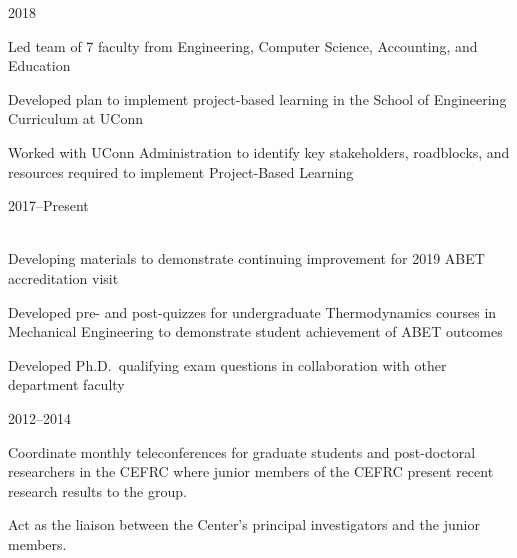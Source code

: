 \begin{lonelist}

\item[]  \hfill 2018\\

\begin{innerlist}
    \item Led team of 7 faculty from Engineering, Computer Science, Accounting, and
    Education
    \item Developed plan to implement project-based learning in the School of Engineering
    Curriculum at UConn
    \item Worked with UConn Administration to identify key stakeholders, roadblocks, and
    resources required to implement Project-Based Learning
\end{innerlist}

\item[]  \hfill 2017--Present\\
\\

\begin{innerlist}
    \item Developing materials to demonstrate continuing improvement for 2019 ABET
    accreditation visit
    \item Developed pre- and post-quizzes for undergraduate Thermodynamics courses in
    Mechanical Engineering to demonstrate student achievement of ABET outcomes
    \item Developed Ph.D.\ qualifying exam questions in collaboration with other
    department faculty
\end{innerlist}

\item[]  \hfill 2012--2014\\

\begin{innerlist}
    \item Coordinate monthly teleconferences for graduate students and post-doctoral
    researchers in the CEFRC where junior members of the CEFRC present recent research
    results to the group.
    \item Act as the liaison between the Center's principal investigators and the junior
    members.
\end{innerlist}


\end{lonelist}
